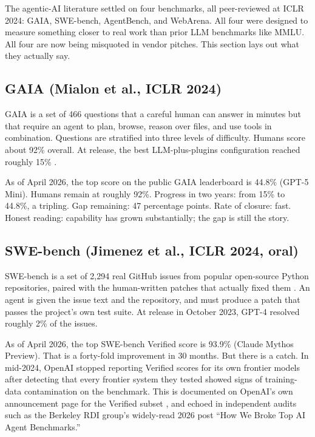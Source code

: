 \documentclass[11pt]{article}
\begin{document}
The agentic-AI literature settled on four benchmarks, all peer-reviewed
at ICLR 2024: GAIA, SWE-bench, AgentBench, and WebArena. All four were
designed to measure something closer to real work than prior LLM
benchmarks like MMLU. All four are now being misquoted in vendor
pitches. This section lays out what they actually say.

\subsection*{GAIA (Mialon et al., ICLR 2024)}

GAIA is a set of 466 questions that a careful human can answer in
minutes but that require an agent to plan, browse, reason over files,
and use tools in combination. Questions are stratified into three
levels of difficulty. Humans score about 92\% overall. At release,
the best LLM-plus-plugins configuration reached roughly 15\%
\citep{mialon2024gaia}.

As of April 2026, the top score on the public GAIA leaderboard is
44.8\% (GPT-5 Mini). Humans remain at roughly 92\%. Progress in two
years: from 15\% to 44.8\%, a tripling. Gap remaining: 47 percentage
points. Rate of closure: fast. Honest reading: capability has grown
substantially; the gap is still the story.

\subsection*{SWE-bench (Jimenez et al., ICLR 2024, oral)}

SWE-bench is a set of 2,294 real GitHub issues from popular
open-source Python repositories, paired with the human-written patches
that actually fixed them \citep{jimenez2024swebench}. An agent is
given the issue text and the repository, and must produce a patch
that passes the project's own test suite. At release in October 2023,
GPT-4 resolved roughly 2\% of the issues.

As of April 2026, the top SWE-bench Verified score is 93.9\% (Claude
Mythos Preview). That is a forty-fold improvement in 30 months. But
there is a catch. In mid-2024, OpenAI stopped reporting Verified
scores for its own frontier models after detecting that every frontier
system they tested showed signs of training-data contamination on the
benchmark. This is documented on OpenAI's own announcement page for
the Verified subset \citep{openai2024swebenchverified}, and echoed in
independent audits such as the Berkeley RDI group's widely-read 2026
post ``How We Broke Top AI Agent Benchmarks.''
\end{document}
